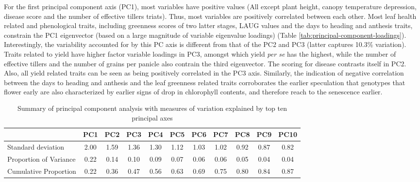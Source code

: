 \documentclass[12pt,oneside]{dukestatscithesis} %
\begin{document}
For the first principal component axis (PC1), most variables have positive values (All except plant height, canopy temperature depression, disease score and the number of effective tillers triats). Thus, most variables are positively correlated between each other. Most leaf health related and phenological traits, including greenness scores of two latter stages, LAUG values and the days to heading and anthesis traits, constrain the PC1 eigenvector (based on a large magnitude of variable eigenvalue loadings) (Table \ref{tab:principal-component-loadings}). Interestingly, the variability accounted for by this PC axis is different from that of the PC2 and PC3 (latter captures 10.3\% variation). Traits related to yield have higher factor variable loadings in PC3, amongst which yield \emph{per se} has the highest, while the number of effective tillers and the number of grains per panicle also contrain the third eigenvector. The scoring for disease contrasts itself in PC2. Also, all yield related traits can be seen as being positively correlated in the PC3 axis. Similarly, the indication of negative correlation between the days to heading and anthesis and the leaf greenness related traits corroborates the earlier speculation that genotypes that flower early are also characterized by earlier signs of drop in chlorophyll contents, and therefore reach to the senescence earlier.
\begin{table}[H]

\caption{\label{tab:principal-component-summary}Summary of principal component analysis with measures of variation explained by top ten principal axes}
\centering
\fontsize{11}{13}\selectfont
\begin{tabular}[t]{lcccccccccc}
\toprule
\textbf{ } & \textbf{PC1} & \textbf{PC2} & \textbf{PC3} & \textbf{PC4} & \textbf{PC5} & \textbf{PC6} & \textbf{PC7} & \textbf{PC8} & \textbf{PC9} & \textbf{PC10}\\
\midrule
Standard deviation & 2.00 & 1.59 & 1.36 & 1.30 & 1.12 & 1.03 & 1.02 & 0.92 & 0.87 & 0.82\\
Proportion of Variance & 0.22 & 0.14 & 0.10 & 0.09 & 0.07 & 0.06 & 0.06 & 0.05 & 0.04 & 0.04\\
Cumulative Proportion & 0.22 & 0.36 & 0.47 & 0.56 & 0.63 & 0.69 & 0.75 & 0.80 & 0.84 & 0.87\\
\bottomrule
\end{tabular}
\end{table}
\end{document}
